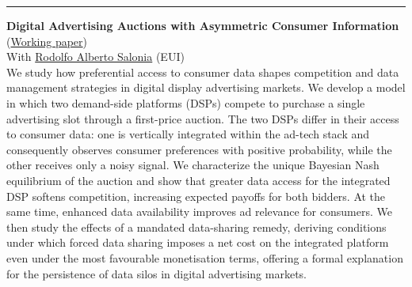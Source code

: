 \hrule %
\vspace{3mm}
\justifying
    \textbf{Digital Advertising Auctions with Asymmetric Consumer Information} (\href{https://cadmus.eui.eu/entities/publication/29c0f872-9539-4541-be85-8cd107cd6219}{Working paper}) \\[3pt]
    With \href{https://www.eui.eu/people?id=rodolfo-salonia}{Rodolfo Alberto Salonia} (EUI) \\[3pt]
    We study how preferential access to consumer data shapes competition and data management strategies in digital display advertising markets. We develop a model in which two demand-side platforms (DSPs) compete to purchase a single advertising slot through a first-price auction. The two DSPs differ in their access to consumer data: one is vertically integrated within the ad-tech stack and consequently observes consumer preferences with positive probability, while the other receives only a noisy signal. We characterize the unique Bayesian Nash equilibrium of the auction and show that greater data access for the integrated DSP softens competition, increasing expected payoffs for both bidders. At the same time, enhanced data availability improves ad relevance for consumers. We then study the effects of a mandated data-sharing remedy, deriving conditions under which forced data sharing imposes a net cost on the integrated platform even under the most favourable monetisation terms, offering a formal explanation for the persistence of data silos in digital advertising markets. \\[3pt]
